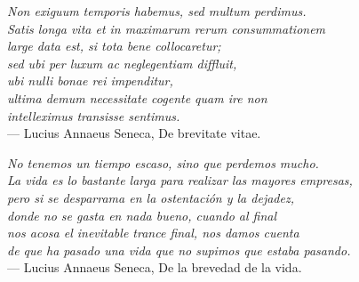 \thispagestyle{empty}
{}

\vspace*{1cm}


\begin{flushright}{\slshape
		Non exiguum temporis habemus, sed multum perdimus. \\
		Satis longa vita et in maximarum rerum consummationem\\
		large data est, si tota bene collocaretur;\\
		sed ubi per luxum ac neglegentiam diffluit,\\
		ubi nulli bonae rei impenditur, \\
		ultima demum necessitate cogente quam ire non \\
		intelleximus transisse sentimus.} \\ \medskip
		--- Lucius Annaeus Seneca, De brevitate vitae.
		
		\bigskip
		\bigskip
		
		{\slshape
		No tenemos un tiempo escaso, sino que perdemos mucho. \\
		La vida es lo bastante larga para realizar las mayores empresas,\\
		pero si se desparrama en la ostentación y la dejadez,\\
		donde no se gasta en nada bueno, cuando al final \\
		nos acosa el inevitable trance final, nos damos cuenta \\
		de que ha pasado una vida que no supimos que estaba pasando.} \\ \medskip
		--- Lucius Annaeus Seneca, De la brevedad de la vida.
\end{flushright}

%
